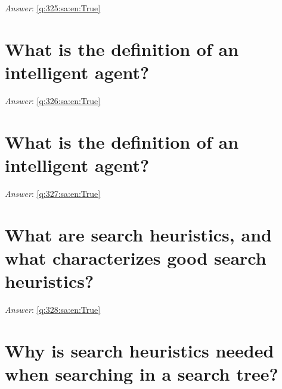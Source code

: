 \documentclass[a4paper,11pt,oneside]{book}
\begin{document}
\begin{sloppypar}
\vspace{1cm}

\textit{Answer}: \autoref{q:325:sa:en:True}



\section{What is the definition of an intelligent agent?}

\label{q:326:sa:en:False}

\vspace{2cm}

\noindent\makebox[\textwidth]{\hrulefill}

\vspace{1cm}

\textit{Answer}: \autoref{q:326:sa:en:True}



\section{What is the definition of an intelligent agent?}

\label{q:327:sa:en:False}

\vspace{2cm}

\noindent\makebox[\textwidth]{\hrulefill}

\vspace{1cm}

\textit{Answer}: \autoref{q:327:sa:en:True}



\section{What are search heuristics, and what characterizes good search heuristics?}

\label{q:328:sa:en:False}

\vspace{2cm}

\noindent\makebox[\textwidth]{\hrulefill}

\vspace{1cm}

\textit{Answer}: \autoref{q:328:sa:en:True}



\section{Why is search heuristics needed when searching in a search tree?}


\end{sloppypar}
\end{document}
